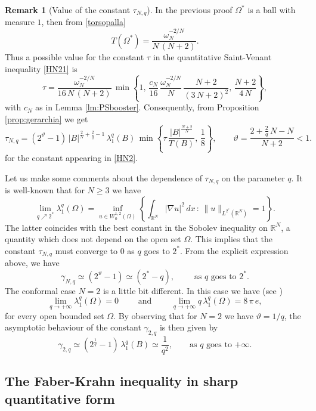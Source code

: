 \documentclass{amsart}
\theoremstyle{definition}
\newtheorem{remark}[lemma]{Remark}
\numberwithin{equation}{section}
\begin{document}
\begin{remark}[Value of the constant $\tau_{N,q}$]
\label{oss:costanta}
In the previous proof $\Omega^*$ is a ball with measure $1$, then from \eqref{torsopalla}
\[
T(\Omega^*)=\frac{\omega_N^{-2/N}}{N\,(N+2)}.
\]
Thus a possible value for the constant $\tau$ in the quantitative Saint-Venant inequality \eqref{HN21} is
\[
\tau=\frac{\omega_N^{-2/N}}{16\,N\,(N+2)}\,\min\left\{1,\,\frac{c_N}{16}\,\frac{\omega_N^{-2/N}}{N}\,\frac{N+2}{(3\,N+2)^2},\,\frac{N+2}{4\,N}\right\},
\]
with $c_N$ as in Lemma \ref{lm:PSbooster}. Consequently, from Proposition \ref{prop:gerarchia}
we get
\[
\tau_{N,q}=(2^{\vartheta}-1)\,|B|^{\frac{2}{N}+\frac{2}{q}-1}\,\lambda_1^q(B)\,\min\left\{\tau\,\frac{|B|^\frac{N+2}{N}}{T(B)},\,\frac{1}{8}\right\},\qquad \vartheta=\frac{2+\displaystyle\frac{2}{q}\,N-N}{N+2}<1.
\]
for the constant appearing in \eqref{HN2}. 
\par
Let us make some comments about the dependence of $\tau_{N,q}$ on the parameter $q$. It is well-known that for $N\ge 3$ we have
\[
\lim_{q\nearrow 2^*} \lambda_{1}^q(\Omega)=\inf_{u\in W^{1,2}_0(\Omega)}\left\{\int_{\mathbb{R}^N} |\nabla u|^2\, dx\, :\,\|u\|_{L^{2^*}(\mathbb{R}^N)}=1\right\}.
\]
The latter coincides with the best constant in the Sobolev inequality on $\mathbb{R}^N$, a quantity which does not depend on the open set $\Omega$. This implies that the constant $\tau_{N,q}$ must converge to $0$ as $q$ goes to $2^*$. From the explicit expression above, we have 
\[
\gamma_{N,q}\simeq (2^{\vartheta}-1)\simeq (2^*-q),\qquad \mbox{ as $q$ goes to $2^*$.}
\]
The conformal case $N=2$ is a little bit different. In this case we have (see \cite[Lemma 2.2]{MR1232190})
\[
\lim_{q\to+\infty} \lambda_{1}^q(\Omega)=0\qquad \mbox{ and }\qquad \lim_{q\to+\infty} q\, \lambda_{1}^q(\Omega)=8\, \pi\, e,
\] 
for every open bounded set $\Omega$. By observing that for $N=2$ we have $\vartheta=1/q$, the asymptotic behaviour of the constant $\gamma_{2,q}$ is then given by
\[
\gamma_{2,q}\simeq \left(2^\frac{1}{q}-1\right)\, \lambda_{1}^q(B)\simeq \frac{1}{q^2},\qquad \mbox{as $q$ goes to $+\infty$.}
\]
\end{remark}

\subsection{The Faber-Krahn inequality in sharp quantitative form}
\end{document}
